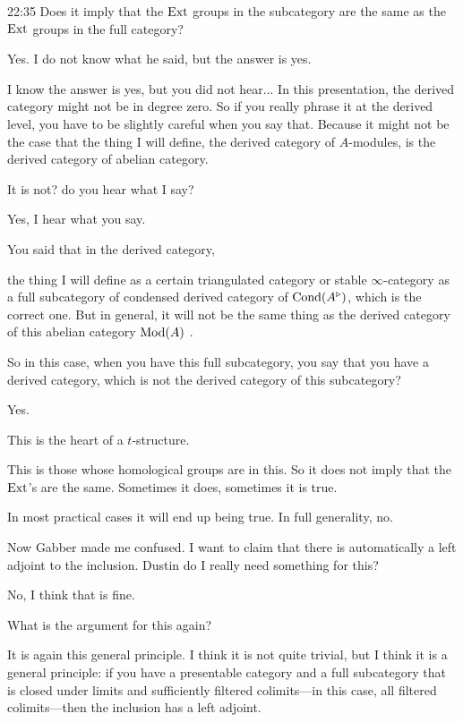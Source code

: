 \begin{unfinished}{22:35}
\gabber Does it imply that the $\operatorname{Ext}$ groups in the subcategory are the same as the $\operatorname{Ext}$ groups in the full category?

\clausen Yes. I do not know what he said, but the answer is yes.

\scholze I know the answer is yes, but you did not hear... In this presentation, the derived category might not be in degree zero. So if you really phrase it at the derived level, you have to be slightly careful when you say that. 
Because it might not be the case that the thing I will define, the derived category of $A$-modules, is the derived category of abelian category. 

\gabber It is not? do you hear what I say?

\scholze Yes, I hear what you say. 

You said that in the derived category,

the thing I will define as a certain triangulated category or stable $\infty$-category as a full subcategory of condensed derived category of $\mathrm{Cond}(A^\triangleright)$, which is the correct one. But in general, it will not be the same thing as the derived category of this abelian category $\operatorname{Mod}(A)$ .

\gabber So in this case, when you have this full subcategory, you say that you have a derived category, which is not the derived category of this subcategory?

\scholze Yes.

\clausen This is the heart of a $t$-structure. 

\gabber This is those whose homological groups are in this. So it does not imply that the $\operatorname{Ext}$'s are the same. Sometimes it does, sometimes it is true.

\scholze In most practical cases it will end up being true. In full generality, no.

\scholze Now Gabber made me confused. I want to claim that there is automatically a left adjoint to the inclusion.
\scholze Dustin do I really need something for this?

\clausen No, I think that is fine.

\scholze What is the argument for this again?

\clausen It is again this general principle. I think it is not quite trivial, but I think it is a general principle: if you have a presentable category and a full subcategory that is closed under limits and sufficiently filtered colimits---in this case, all filtered colimits---then the inclusion has a left adjoint. 


\end{unfinished}
